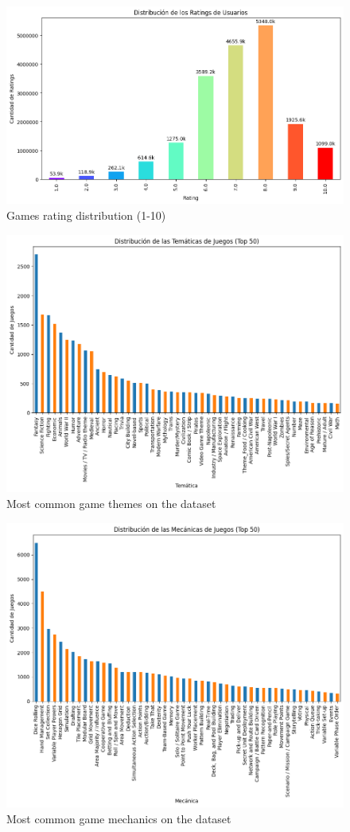 \documentclass{article}
\begin{document}
\begin{figure}[h]
    \centering
    \includegraphics[width=0.8\linewidth]{distribucionRatings.png}
    \caption{Games rating distribution (1-10)}
    \label{fig:distribucionRatings}
\end{figure}

\begin{figure}[h]
    \centering
    \includegraphics[width=0.8\linewidth]{tematicasComunes.png}
    \caption{Most common game themes on the dataset}
    \label{fig:tematicasComunes}
\end{figure}

\begin{figure}[h]
    \centering
    \includegraphics[width=0.8\linewidth]{mecanicasComunes.png}
    \caption{Most common game mechanics on the dataset}
    \label{fig:mecanicasComunes}
\end{figure}
\end{document}
